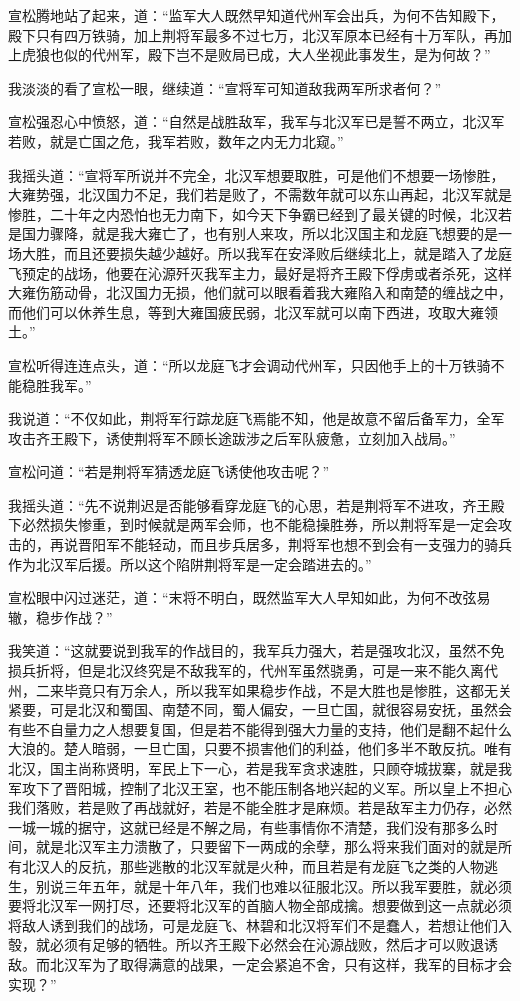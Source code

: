 宣松腾地站了起来，道：“监军大人既然早知道代州军会出兵，为何不告知殿下，殿下只有四万铁骑，加上荆将军最多不过七万，北汉军原本已经有十万军队，再加上虎狼也似的代州军，殿下岂不是败局已成，大人坐视此事发生，是为何故？”

我淡淡的看了宣松一眼，继续道：“宣将军可知道敌我两军所求者何？”

宣松强忍心中愤怒，道：“自然是战胜敌军，我军与北汉军已是誓不两立，北汉军若败，就是亡国之危，我军若败，数年之内无力北窥。”

我摇头道：“宣将军所说并不完全，北汉军想要取胜，可是他们不想要一场惨胜，大雍势强，北汉国力不足，我们若是败了，不需数年就可以东山再起，北汉军就是惨胜，二十年之内恐怕也无力南下，如今天下争霸已经到了最关键的时候，北汉若是国力骤降，就是我大雍亡了，也有别人来攻，所以北汉国主和龙庭飞想要的是一场大胜，而且还要损失越少越好。所以我军在安泽败后继续北上，就是踏入了龙庭飞预定的战场，他要在沁源歼灭我军主力，最好是将齐王殿下俘虏或者杀死，这样大雍伤筋动骨，北汉国力无损，他们就可以眼看着我大雍陷入和南楚的缠战之中，而他们可以休养生息，等到大雍国疲民弱，北汉军就可以南下西进，攻取大雍领土。”

宣松听得连连点头，道：“所以龙庭飞才会调动代州军，只因他手上的十万铁骑不能稳胜我军。”

我说道：“不仅如此，荆将军行踪龙庭飞焉能不知，他是故意不留后备军力，全军攻击齐王殿下，诱使荆将军不顾长途跋涉之后军队疲惫，立刻加入战局。”

宣松问道：“若是荆将军猜透龙庭飞诱使他攻击呢？”

我摇头道：“先不说荆迟是否能够看穿龙庭飞的心思，若是荆将军不进攻，齐王殿下必然损失惨重，到时候就是两军会师，也不能稳操胜券，所以荆将军是一定会攻击的，再说晋阳军不能轻动，而且步兵居多，荆将军也想不到会有一支强力的骑兵作为北汉军后援。所以这个陷阱荆将军是一定会踏进去的。”

宣松眼中闪过迷茫，道：“末将不明白，既然监军大人早知如此，为何不改弦易辙，稳步作战？”

我笑道：“这就要说到我军的作战目的，我军兵力强大，若是强攻北汉，虽然不免损兵折将，但是北汉终究是不敌我军的，代州军虽然骁勇，可是一来不能久离代州，二来毕竟只有万余人，所以我军如果稳步作战，不是大胜也是惨胜，这都无关紧要，可是北汉和蜀国、南楚不同，蜀人偏安，一旦亡国，就很容易安抚，虽然会有些不自量力之人想要复国，但是若不能得到强大力量的支持，他们是翻不起什么大浪的。楚人暗弱，一旦亡国，只要不损害他们的利益，他们多半不敢反抗。唯有北汉，国主尚称贤明，军民上下一心，若是我军贪求速胜，只顾夺城拔寨，就是我军攻下了晋阳城，控制了北汉王室，也不能压制各地兴起的义军。所以皇上不担心我们落败，若是败了再战就好，若是不能全胜才是麻烦。若是敌军主力仍存，必然一城一城的据守，这就已经是不解之局，有些事情你不清楚，我们没有那多么时间，就是北汉军主力溃散了，只要留下一两成的余孽，那么将来我们面对的就是所有北汉人的反抗，那些逃散的北汉军就是火种，而且若是有龙庭飞之类的人物逃生，别说三年五年，就是十年八年，我们也难以征服北汉。所以我军要胜，就必须要将北汉军一网打尽，还要将北汉军的首脑人物全部成擒。想要做到这一点就必须将敌人诱到我们的战场，可是龙庭飞、林碧和北汉将军们不是蠢人，若想让他们入彀，就必须有足够的牺牲。所以齐王殿下必然会在沁源战败，然后才可以败退诱敌。而北汉军为了取得满意的战果，一定会紧追不舍，只有这样，我军的目标才会实现？”

